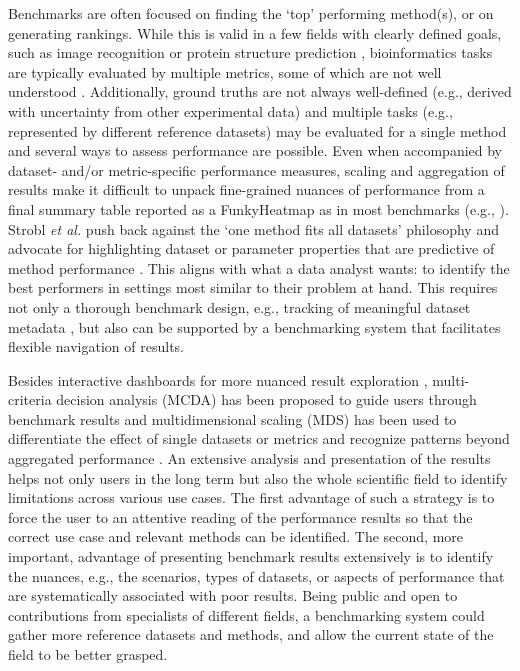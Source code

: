 \documentclass[11pt]{article}
\begin{document}
Benchmarks are often focused on finding the `top' performing method(s), or on generating rankings. While this is valid in a few fields with clearly defined goals, such as image recognition \cite{Khan2018-ot} or protein structure prediction \cite{Jumper2021-oq}, bioinformatics tasks are typically evaluated by multiple metrics, some of which are not well understood \cite{Lutge2021-mt, Reinke2024-dw}. Additionally, ground truths are not always well-defined (e.g., derived with uncertainty from other experimental data) and multiple tasks (e.g., represented by different reference datasets) may be evaluated for a single method and several ways to assess performance are possible. Even when accompanied by dataset- and/or metric-specific performance measures, scaling and aggregation of results make it difficult to unpack fine-grained nuances of performance from a final summary table reported as a FunkyHeatmap \cite{funkyheatmap} as in most benchmarks (e.g., \cite{Saelens2019-jy}). Strobl \textit{et al.} push back against the `one method fits all datasets’ philosophy and advocate for highlighting dataset or parameter properties that are predictive of method performance \cite{Jelizarow2010-kr, Boulesteix2010-zj, Strobl2024-lp}. This aligns with what a data analyst wants: to identify the best performers in settings most similar to their problem at hand. This requires not only a thorough benchmark design, e.g., tracking of meaningful dataset metadata \cite{Strobl2024-lp}, but also can be supported by a benchmarking system that facilitates flexible navigation of results. 

Besides interactive dashboards for more nuanced result exploration \cite{bettr}, multi-criteria decision analysis (MCDA) \cite{Taherdoost2023-wd} has been proposed to guide users through benchmark results and multidimensional scaling (MDS) has been used to differentiate the effect of single datasets or metrics and recognize patterns beyond aggregated performance \cite{Niessl2022-fk}. An extensive analysis and presentation of the results helps not only users in the long term but also the whole scientific field to identify limitations across various use cases. The first advantage of such a strategy is to force the user to an attentive reading of the performance results so that the correct use case and relevant methods can be identified. The second, more important, advantage of presenting benchmark results extensively is to identify the nuances, e.g., the scenarios, types of datasets, or aspects of performance that are systematically associated with poor results. Being public and open to contributions from specialists of different fields, a benchmarking system could gather more reference datasets and methods, and allow the current state of the field to be better grasped. 
\end{document}
